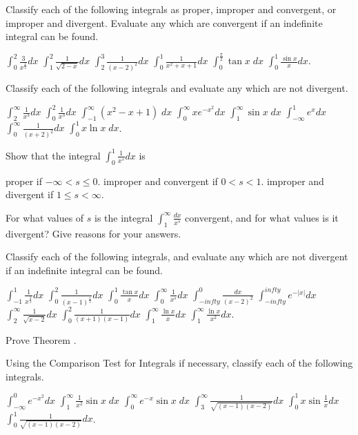 \begin{exercises}

Classify each of the following integrals as proper,
improper and convergent, or improper and divergent.
Evaluate any which are convergent if an
indefinite integral can be found.
\begin{exenum}
\x
$\int_0^2 \frac3{x^{\frac23}} dx$
\x
$\int_1^2 \frac1{\sqrt{2-x}}dx$
\x
$\int_2^3 \frac1{(x-2)^2} dx$
\x
$\int_0^1 \frac1{x^2+x+1} dx$
\x
$\int_0^{\frac{\pi}2} \tan x \; dx$
\x
$\int_0^1 \frac{\sin x}x dx$.
\end{exenum}

Classify each of the following integrals
and evaluate any which are not divergent.
\begin{exenum}
\x
$\int_2^{\infty} \frac1{x^3} dx$
\x
$\int_0^2 \frac1{x^3} dx$
\x
$\int_{-1}^{\infty} (x^2-x+1) \; dx$
\x
$\int_0^{\infty} xe^{-x^2} dx$
\x
$\int_1^{\infty} \sin x \; dx$
\x
$\int_{-\infty}^1 e^xdx$
\x
$\int_0^{\infty} \frac1{(x+2)^2} dx$
\x
$\int_0^1 x \ln x \; dx$.
\end{exenum}

Show that the integral
$\int_0^1 \frac1{x^s} dx$ is
\begin{exenum}
\x
proper if $-\infty < s \leq 0$.
\x
improper and convergent if $0<s<1$.
\x
improper and divergent if $1 \leq s < \infty$.
\end{exenum}

For what values of $s$ is the integral
$\int_1^{\infty} \frac{dx}{x^s}$ convergent,
and for what values is it divergent?
Give reasons for your answers.

Classify each of the following integrals,
and evaluate any which are not divergent
if an indefinite integral can be found.
\begin{exenum}
\x
$\int_{-1}^1 \frac1{x^{\frac23}} dx$
\x
$\int_0^2 \frac1{(x-1)^{\frac13}} dx$
\x
$\int_0^1 \frac{\tan x}x dx$
\x
$\int_0^{\infty} \frac1{x^s} dx$
\x
$\int_{-infty}^0 \frac{dx}{(x-2)^2}$
\x
$\int_{-infty}^{infty} e^{-|x|} dx$
\x
$\int_2^{\infty} \frac1{\sqrt{x-2}} dx$
\x
$\int_0^2 \frac1{(x+1)(x-1)} dx$
\x
$\int_1^{\infty} \frac{\ln x}x dx$
\x
$\int_1^{\infty} \frac{\ln x}{x^2} dx$.
\end{exenum}

Prove Theorem .

Using the Comparison Test for Integrals if necessary,
classify each of the following integrals.
\begin{exenum}
\x
$\int_{-\infty}^0 e^{-x^2} dx$
\x
$\int_1^{\infty} \frac1{x^2} \sin x \; dx$
\x
$\int_0^{\infty} e^{-x} \sin x \; dx$
\x
$\int_3^{\infty} \frac1{\sqrt{(x-1)(x-2)}} dx$
\x
$\int_0^1 x \sin \frac1x dx$
\x
$\int_0^1 \frac1{\sqrt{(x-1)(x-2)}} dx$.
\end{exenum}


\end{exercises}
